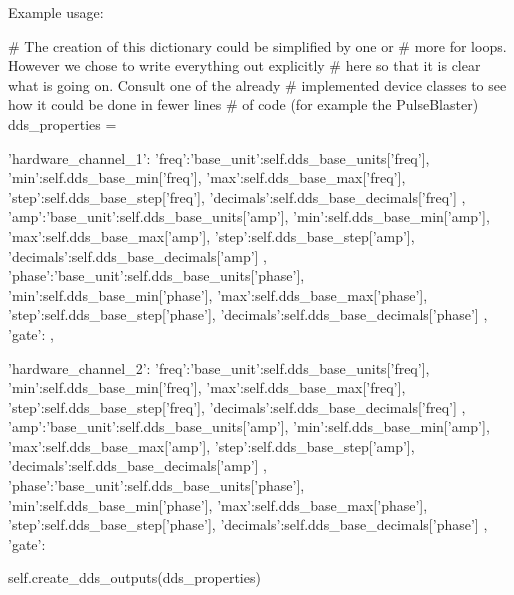 \documentclass[12pt]{article}
\begin{document}
Example usage:
\begin{python}
    # The creation of this dictionary could be simplified by one or
    # more for loops. However we chose to write everything out explicitly
    # here so that it is clear what is going on. Consult one of the already 
    # implemented device classes to see how it could be done in fewer lines
    # of code (for example the PulseBlaster)
    dds_properties = {'hardware_channel_1':
                           {'freq':{'base_unit':self.dds_base_units['freq'],
                                    'min':self.dds_base_min['freq'],
                                    'max':self.dds_base_max['freq'],
                                    'step':self.dds_base_step['freq'],
                                    'decimals':self.dds_base_decimals['freq']
                                   },
                             'amp':{'base_unit':self.dds_base_units['amp'],
                                    'min':self.dds_base_min['amp'],
                                    'max':self.dds_base_max['amp'],
                                    'step':self.dds_base_step['amp'],
                                    'decimals':self.dds_base_decimals['amp']
                                   },
												  'phase':{'base_unit':self.dds_base_units['phase'],
                                    'min':self.dds_base_min['phase'],
                                    'max':self.dds_base_max['phase'],
                                    'step':self.dds_base_step['phase'],
                                    'decimals':self.dds_base_decimals['phase']
                                   },
                            'gate':{}
                            },

                      'hardware_channel_2':
                           {'freq':{'base_unit':self.dds_base_units['freq'],
                                    'min':self.dds_base_min['freq'],
                                    'max':self.dds_base_max['freq'],
                                    'step':self.dds_base_step['freq'],
                                    'decimals':self.dds_base_decimals['freq']
                                   },
                             'amp':{'base_unit':self.dds_base_units['amp'],
                                    'min':self.dds_base_min['amp'],
                                    'max':self.dds_base_max['amp'],
                                    'step':self.dds_base_step['amp'],
                                    'decimals':self.dds_base_decimals['amp']
                                   },
												  'phase':{'base_unit':self.dds_base_units['phase'],
                                    'min':self.dds_base_min['phase'],
                                    'max':self.dds_base_max['phase'],
                                    'step':self.dds_base_step['phase'],
                                    'decimals':self.dds_base_decimals['phase']
                                   },
                            'gate':{}
                            }
                     }
    self.create_dds_outputs(dds_properties)
\end{python}
\end{document}
